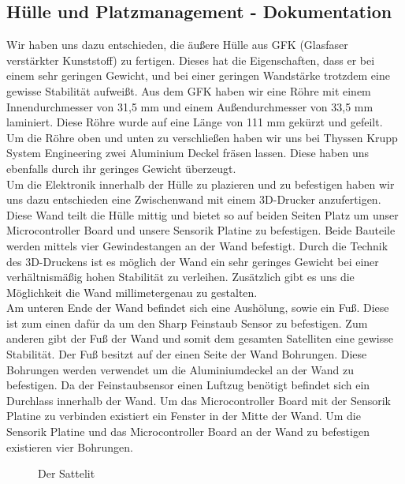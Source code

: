 \subsection {Hülle und Platzmanagement - Dokumentation}
Wir haben uns dazu entschieden, die äußere Hülle aus GFK (Glasfaser verstärkter Kunststoff) zu fertigen. Dieses hat die Eigenschaften, dass er bei einem sehr geringen Gewicht, und bei einer geringen Wandstärke trotzdem eine gewisse Stabilität aufweißt. Aus dem GFK haben wir eine Röhre mit einem Innendurchmesser von 31,5 mm und einem Außendurchmesser von 33,5 mm laminiert. Diese Röhre wurde auf eine Länge von 111 mm gekürzt und gefeilt. Um die Röhre oben und unten zu verschließen haben wir uns bei Thyssen Krupp System Engineering zwei Aluminium Deckel fräsen lassen. Diese haben uns ebenfalls durch ihr geringes Gewicht überzeugt. \\
Um die Elektronik innerhalb der Hülle zu plazieren und zu befestigen haben wir uns dazu entschieden eine Zwischenwand mit einem 3D-Drucker anzufertigen. Diese Wand teilt die Hülle mittig und bietet so auf beiden Seiten Platz um unser Microcontroller Board und unsere Sensorik Platine zu befestigen. Beide Bauteile werden mittels vier Gewindestangen an der Wand befestigt. Durch die Technik des 3D-Druckens ist es möglich der Wand ein sehr geringes Gewicht bei einer verhältnismäßig hohen Stabilität zu verleihen. Zusätzlich gibt es uns die Möglichkeit die Wand millimetergenau zu gestalten. \\
Am unteren Ende der Wand befindet sich eine Aushölung, sowie ein Fuß. Diese ist zum einen dafür da um den Sharp Feinstaub Sensor zu befestigen. Zum anderen gibt der Fuß der Wand und somit dem gesamten Satelliten eine gewisse Stabilität. Der Fuß besitzt auf der einen Seite der Wand Bohrungen. Diese Bohrungen werden verwendet um die Aluminiumdeckel an der Wand zu befestigen. Da der Feinstaubsensor einen Luftzug benötigt befindet sich ein Durchlass innerhalb der Wand. Um das Microcontroller Board mit der Sensorik Platine zu verbinden existiert ein Fenster in der Mitte der Wand. Um die Sensorik Platine und das Microcontroller Board an der Wand zu befestigen existieren vier Bohrungen.

\begin{figure}[h] 
      \centering 
      \caption{Der Sattelit}\label{fig:hla} 
\end{figure} 



